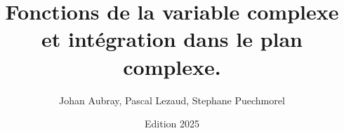 \documentclass[a4paper, twoside, 12pt, notitlepage]{book}
\newtheorem{cor}{Corollaire}[section]
\theoremstyle{definition}
\theoremstyle{remarque}
\begin{document}
\newenvironment{fcor}{%
	\begin{lrbox}{\fthmbox}%
	\begin{minipage}{0.95\textwidth}
	\begin{cor}
	
}{%
\end{cor}
\end{minipage}
\end{lrbox}

\begin{center}
\begin{tikzpicture}
\node[thmbox] (box) {%
	\usebox{\fthmbox}
};
\end{tikzpicture}
\end{center}
}



\newenvironment{exercice}{
\begin{leftbar}
\stepcounter{ExoCtr}{\bfseries Exercice}
\arabic{ExoCtr}
}{\end{leftbar}}


\title{Fonctions de la variable complexe et intégration dans le plan complexe.}
\author{Johan Aubray, Pascal Lezaud, Stephane Puechmorel}
\date{Edition 2025} 

\maketitle


\tableofcontents









\appendix 





\end{document}
